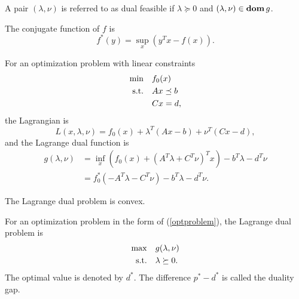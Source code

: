 \documentclass[12pt]{article}
\begin{document}
\begin{definition}
    A pair \((\lambda,\nu)\) is referred to as \textnormal{dual feasible} if \(\lambda\succeq 0\) and \((\lambda,\nu)\in\operatorname{\mathbf{dom}} g\).
\end{definition}

\begin{remark}
    The conjugate function of \(f\) is
    \[f^\ast(y)=\sup_x\left(y^Tx-f(x)\right).\]
\end{remark}

\begin{proposition}
    For an optimization problem with linear constraints
    \[\begin{aligned}
        \min\quad &f_0(x)\\
        \textnormal{s.t.}\quad &Ax\preceq b\\
        &Cx=d,
    \end{aligned}\]
    the Lagrangian is
    \[L(x,\lambda,\nu)=f_0(x)+\lambda^T(Ax-b)+\nu^T(Cx-d),\]
    and the Lagrange dual function is
    \[\begin{aligned}
        g(\lambda,\nu)
        &=\inf_x\left(f_0(x)+\left(A^T\lambda+C^T\nu\right)^Tx\right)-b^T\lambda-d^T\nu\\
        &=f_0^\ast\left(-A^T\lambda-C^T\nu\right)-b^T\lambda-d^T\nu.
    \end{aligned}\]
\end{proposition}

\begin{remark}
    The Lagrange dual problem is convex.
\end{remark}

\begin{definition}
    For an optimization problem in the form of (\ref{optproblem}), the \textnormal{Lagrange dual problem} is
    \[\begin{aligned}
        \max\quad&g(\lambda,\nu)\\
        \textnormal{s.t.}\quad &\lambda\succeq 0.
    \end{aligned}\]
    The optimal value is denoted by \(d^\ast\). The difference \(p^\ast-d^\ast\) is called the \textnormal{duality gap}.
\end{definition}
\end{document}
